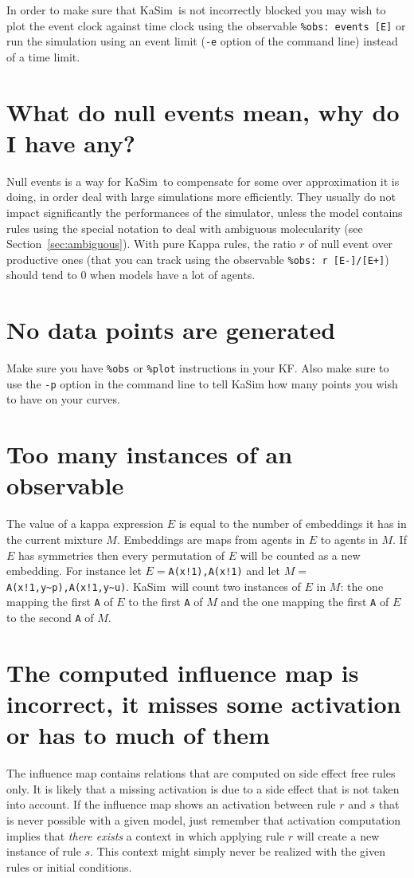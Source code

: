 \documentclass[11pt]{book}
\def\KaSim{\textsf{KaSim}}
\def\intstate{\textasciitilde}
\def\ttt#1{\texttt{#1}}
\begin{document}
In order to make sure that \KaSim~is not incorrectly blocked you may wish to plot the event clock against time clock using the observable \ttt{\%obs: {\textquotesingle}events{\textquotesingle} [E]} or run the simulation using an event limit (\ttt{-e} option of the command line) instead of a time limit.

\section*{What do null events mean, why do I have any?}

Null events is a way for \KaSim~to compensate for some over approximation it is doing, in order deal with large simulations more efficiently. They usually do not impact significantly the performances of the simulator, unless the model contains rules using the special notation to deal with ambiguous molecularity (see Section~\ref{sec:ambiguous}). With pure Kappa rules, the ratio $r$ of null event over productive ones (that you can track using the observable \ttt{\%obs: {\textquotesingle}r{\textquotesingle}  [E-]/[E+]}) should tend to 0 when models have a lot of agents.

\section*{No data points are generated}
Make sure you have \ttt{\%obs} or \ttt{\%plot} instructions in your KF. Also make sure to use the \ttt{-p} option in the command line to tell KaSim how many points you wish to have on your curves. 

\section*{Too many instances of an observable}
The value of a kappa expression $E$  is equal to the number of embeddings it has in the current mixture $M$. Embeddings are maps from agents in $E$  to agents in $M$. If $E$ has symmetries then every permutation of $E$ will be counted as a new embedding. For instance let $E=$\ttt{A(x!1),A(x!1)}  and let $M=$\ttt{A(x!1,y\intstate p),A(x!1,y\intstate u)}. 
\KaSim~will count two instances of $E$ in $M$: the one mapping the first \ttt{A} of $E$ to the first \ttt{A} of $M$ and the one mapping the first \ttt{A} of $E$ to the second \ttt{A} of $M$.
 
\section*{The computed influence map is incorrect, it misses some activation or has to much of them}
The influence map contains relations that are computed on side effect free rules only. It is likely that a missing activation is due to a side effect that is not taken into account. If the influence map shows an activation between rule $r$ and $s$ that is never possible with a given model, just remember that activation computation implies that \emph{there exists} a context in which applying rule $r$ will create a new instance of rule $s$. This context might simply never be realized with the given rules or initial conditions.
\end{document}
